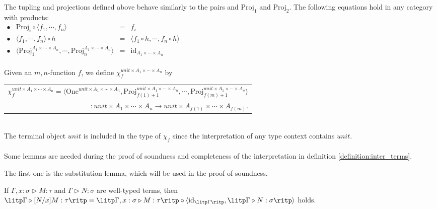 The tupling and projections defined above behave similarly to the pairs and $ \text{Proj}_1 $ and $ \text{Proj}_2 $. The following equations hold in any category with products:\\[5pt]
$
\begin{array}{rlcl}
\bullet & \text{Proj}_i \circ \langle f_1, \cdots , f_n \rangle & = & f_i \\[5pt]
\bullet & \langle f_1, \cdots , f_n \rangle \circ h & = & \langle f_1 \circ h, \cdots , f_n \circ h \rangle \\[5pt]
\bullet & \langle \text{Proj}_1^{A_1 \times \cdots \times A_n}, \cdots , \text{Proj}_n^{A_1 \times \cdots \times A_n} \rangle & = & \text{id}_{A_1 \times \cdots \times A_n} \\[10pt]
\end{array}
$

Given an $m,n$-function $ f $, we define $ \chi_f^{unit \times A_1 \times \cdots \times A_n} $ by \\[3pt]
\begin{tabular}{m{}}
$
\chi_f^{unit \times A_1 \times \cdots \times A_n} = \langle \text{One}^{unit \times A_1 \times \cdots \times A_n}, \text{Proj}_{f(1)+1}^{unit \times A_1 \times \cdots \times A_n}, \cdots , \text{Proj}_{f(m)+1}^{unit \times A_1 \times \cdots \times A_n} \rangle
$ \\[3pt]
\multicolumn{1}{r}{$ : unit \times A_1 \times \cdots \times A_n \to unit \times A_{f(1)} \times \cdots \times A_{f(m)} $.}
\end{tabular} \\[3pt]
The terminal object $ unit $ is included in the type of $ \chi_f $ since the interpretation of any type context contains $ unit $.
\\
\\
Some lemmas are needed during the proof of soundness and completeness of the interpretation in definition \ref{definition:inter_terms}.

The first one is the substitution lemma, which will be used in the proof of soundness.

\begin{lemma}
\label{lemma:subs}
If $ \Gamma , x: \sigma \triangleright M: \tau $ and $ \Gamma \triangleright N: \sigma $ are well-typed terms, then $ \litp \Gamma \triangleright [N/x]M: \tau \ritp = \litp \Gamma , x: \sigma \triangleright M: \tau \ritp \circ \langle \textnormal{id}_{\litp \Gamma \ritp} , \litp \Gamma \triangleright N: \sigma \ritp \rangle $ holds.
\end{lemma}

